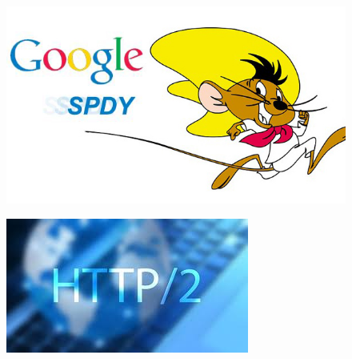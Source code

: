 \documentclass[graphic, aspectratio=169]{beamer}
\begin{document}
\begin{frame}{}
    \begin{figure}[h!]
    \centering
    \includegraphics[scale=0.3]{images/google-spdy.jpg}
    \label{fig:Google SPDY}
\end{figure}
    \begin{figure}[h!]
    \centering
    \includegraphics[scale=0.5]{images/http2.jpeg}
    \label{fig:HTTP/2.0}
\end{figure}

\end{frame}
\end{document}
